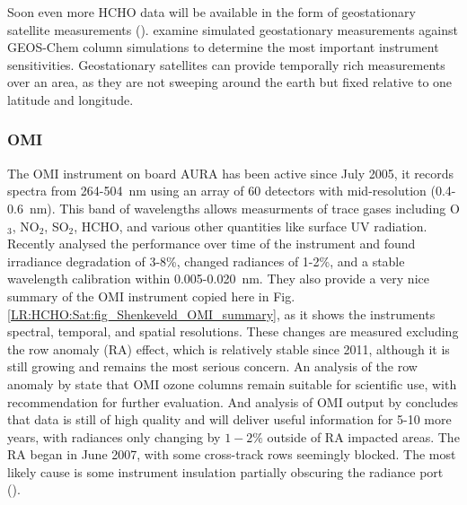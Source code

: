     Soon even more HCHO data will be available in the form of geostationary satellite measurements (\cite{Kwon2017}).
    \cite{Kwon2017} examine simulated geostationary measurements against GEOS-Chem column simulations to determine the most important instrument sensitivities.
    Geostationary satellites can provide temporally rich measurements over an area, as they are not sweeping around the earth but fixed relative to one latitude and longitude.
    
    \subsubsection{OMI}
    
      The OMI instrument on board AURA has been active since July 2005, it records spectra from 264-504~nm using an array of 60 detectors with mid-resolution (0.4-0.6~nm).
      This band of wavelengths allows measurments of trace gases including O$_3$, NO$_2$, SO$_2$, HCHO, and various other quantities like surface UV radiation.
      Recently \cite{Schenkeveld2017} analysed the performance over time of the instrument and found irradiance degradation of 3-8\%, changed radiances of 1-2\%, and a stable wavelength calibration within 0.005-0.020~nm.
      They also provide a very nice summary of the OMI instrument copied here in Fig. \ref{LR:HCHO:Sat:fig_Shenkeveld_OMI_summary}, as it shows the instruments spectral, temporal, and spatial resolutions.
      These changes are measured excluding the row anomaly (RA) effect, which is relatively stable since 2011, although it is still growing and remains the most serious concern.
      An analysis of the row anomaly by \cite{Huang2017} state that OMI ozone columns remain suitable for scientific use, with recommendation for further evaluation.
      And analysis of OMI output by \cite{Schenkeveld2017} concludes that data is still of high quality and will deliver useful information for 5-10 more years, with radiances only changing by $1-2\%$ outside of RA impacted areas.
      The RA began in June 2007, with some cross-track rows seemingly blocked. The most likely cause is some instrument insulation partially obscuring the radiance port (\cite{Schenkeveld2017}).
      
